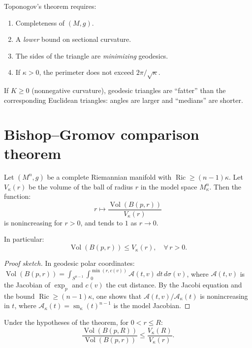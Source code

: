 \begin{warning}[title=\textbf{Hypotheses for Toponogov}]
Toponogov's theorem requires:
\begin{enumerate}
    \item Completeness of $(M, g)$.
    \item A \emph{lower} bound on sectional curvature.
    \item The sides of the triangle are \emph{minimizing} geodesics.
    \item If $\kappa > 0$, the perimeter does not exceed $2\pi/\sqrt{\kappa}$.
\end{enumerate}
\end{warning}

\begin{corollary}
If $K \geq 0$ (nonnegative curvature), geodesic triangles are ``fatter'' than
the corresponding Euclidean triangles: angles are larger and ``medians'' are shorter.
\end{corollary}

\section{Bishop--Gromov comparison theorem}

\begin{theorem}
\label{thm:bishop_gromov}
Let $(M^n, g)$ be a complete Riemannian manifold with
$\operatorname{Ric} \geq (n-1)\kappa$. Let $V_\kappa(r)$ be the volume of the
ball of radius $r$ in the model space $M^n_\kappa$. Then the function:
\[
    r \mapsto \frac{\operatorname{Vol}(B(p, r))}{V_\kappa(r)}
\]
is nonincreasing for $r > 0$, and tends to $1$ as $r \to 0$.

In particular:
\[
    \operatorname{Vol}(B(p, r)) \leq V_\kappa(r), \quad \forall\, r > 0.
\]
\end{theorem}

\begin{proof}[Proof sketch]
In geodesic polar coordinates:
$\operatorname{Vol}(B(p,r)) = \int_{S^{n-1}} \int_0^{\min(r, c(v))}
\mathcal{A}(t, v)\, dt\, d\sigma(v)$,
where $\mathcal{A}(t, v)$ is the Jacobian of $\exp_p$ and $c(v)$ the cut distance.
By the Jacobi equation and the bound $\operatorname{Ric} \geq (n-1)\kappa$, one
shows that $\mathcal{A}(t,v)/\mathcal{A}_\kappa(t)$ is nonincreasing in $t$,
where $\mathcal{A}_\kappa(t) = \operatorname{sn}_\kappa(t)^{n-1}$ is the model
Jacobian.
\end{proof}

\begin{corollary}
Under the hypotheses of the theorem, for $0 < r \leq R$:
\[
    \frac{\operatorname{Vol}(B(p, R))}{\operatorname{Vol}(B(p, r))}
    \leq \frac{V_\kappa(R)}{V_\kappa(r)}.
\]
\end{corollary}

